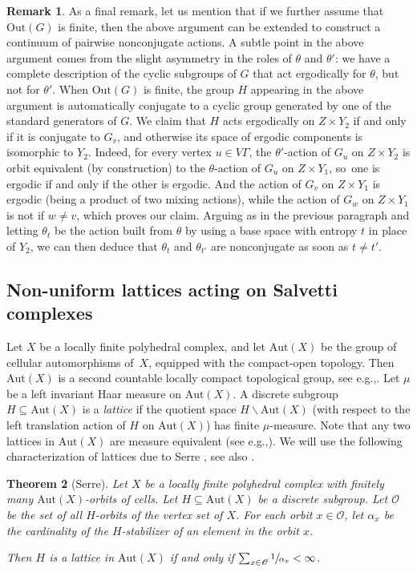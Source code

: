 \documentclass[11pt]{article}
\newcommand{\eg}{e.g.,\xspace}
\numberwithin{equation}{section}
\let\mathcal\mathscr
\theoremstyle{plain}
\newtheorem{theo}{Theorem}[section]
\theoremstyle{definition}
\newtheorem{rk}[theo]{Remark}
\newcommand{\Aut}{\mathrm{Aut}}
\newcommand{\Out}{\mathrm{Out}}
\begin{document}
\begin{rk}
As a final remark, let us mention that if we further assume that $\Out(G)$ is finite, then the above argument can be extended to construct a continuum of pairwise nonconjugate actions. A subtle point in the above argument comes from the slight asymmetry in the roles of $\theta$ and $\theta'$: we have a complete description of the cyclic subgroups of $G$ that act ergodically for $\theta$, but not for $\theta'$. When $\Out(G)$ is finite, the group $H$ appearing in the above argument is automatically conjugate to a cyclic group generated by one of the standard generators of $G$. We claim that $H$ acts ergodically on $Z\times Y_2$ if and only if it is conjugate to $G_v$, and otherwise its space of ergodic components is isomorphic to $Y_2$. Indeed, for every vertex $u\in V\Gamma$, the $\theta'$-action of $G_u$ on $Z\times Y_2$ is orbit equivalent (by construction) to the $\theta$-action of $G_u$ on $Z\times Y_1$, so~one is ergodic if and only if the other is ergodic. And the action of $G_v$ on $Z\times Y_1$ is ergodic (being a product of two mixing actions), while the action of $G_w$ on $Z\times Y_1$ is not if $w\neq v$, which proves our claim. Arguing as in the previous paragraph and letting $\theta_t$ be the action built from $\theta$ by using a base space with entropy $t$ in place of $Y_2$, we can then deduce that $\theta_t$ and $\theta_{t'}$ are nonconjugate as soon as $t\neq t'$.
\end{rk}

\subsection{Non-uniform lattices acting on Salvetti complexes}

Let $X$ be a locally finite polyhedral complex, and let $\Aut(X)$ be the group of cellular automorphisms of~$X$, equipped with the compact-open topology. Then $\Aut(X)$ is a second countable locally compact topological group, see \eg \cite[Ex.\,5.B.11]{cornulier2014metric}. Let $\mu$ be a left invariant Haar measure on $\Aut(X)$. A discrete subgroup $H\subseteq \Aut(X)$ is a \emph{lattice} if the quotient space $H\backslash\Aut(X)$ (with respect to the left translation action of $H$ on $\Aut(X)$) has finite $\mu$-measure. Note that any two lattices in $\Aut(X)$ are measure equivalent (see \eg \cite[Ex.\,1.2]{Fur}). We will use the following characterization of lattices due to Serre \cite{Serre}, see also \cite[Chap.\,1.5]{bass2001tree}.

\begin{theo}[Serre]
\label{theo:non-uniform lattice}
Let $X$ be a locally finite polyhedral complex with finitely many $\Aut(X)$-orbits of cells. Let $H\subseteq \Aut(X)$ be a discrete subgroup. Let $\mathcal{O}$ be the set of all $H$-orbits of the vertex set of $X$. For each orbit $x\in\mathcal{O}$, let $\alpha_x$ be the cardinality of the $H$-stabilizer of an element in the orbit $x$.

Then $H$ is a lattice in $\Aut(X)$ if and only if $\sum_{x\in \mathcal{O}}\sfrac{1}{\alpha_x}<\infty$.
\end{theo}
\end{document}
